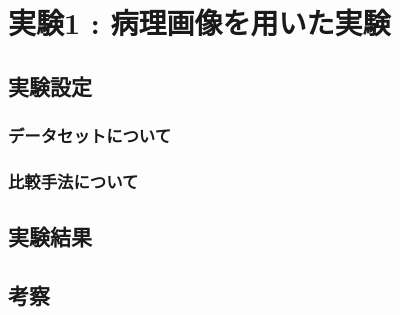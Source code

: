 \chapter{実験1 : 病理画像を用いた実験}
\section{実験設定}
\subsection{データセットについて}
\subsection{比較手法について}
\section{実験結果}
\section{考察}
